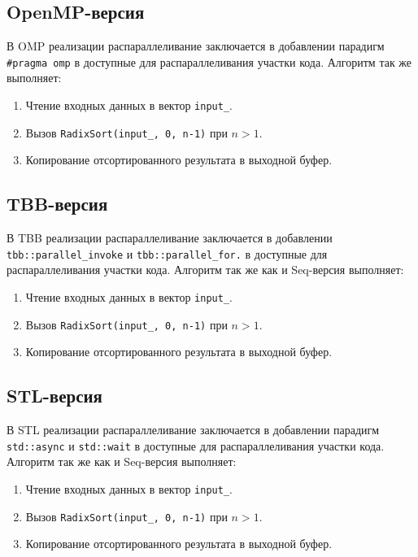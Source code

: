 \documentclass[a4paper,12pt]{article}
\begin{document}
\subsection{OpenMP-версия}
\hspace*{1.25em}В OMP реализации распараллеливание заключается в добавлении парадигм \texttt{\#pragma omp} в доступные для распараллеливания участки кода. Алгоритм так же выполняет:
\begin{enumerate}
    \item Чтение входных данных в вектор \texttt{input\_}.
    \item Вызов \texttt{RadixSort(input\_, 0, n-1)} при $n>1$.
    \item Копирование отсортированного результата в выходной буфер.
\end{enumerate}


\subsection{TBB-версия}
\hspace*{1.25em}В TBB реализации распараллеливание заключается в добавлении \texttt{tbb::parallel\_invoke} и \texttt{tbb::parallel\_for.} в доступные для распараллеливания участки кода. Алгоритм так же как и Seq-версия выполняет:
\begin{enumerate}
    \item Чтение входных данных в вектор \texttt{input\_}.
    \item Вызов \texttt{RadixSort(input\_, 0, n-1)} при $n>1$.
    \item Копирование отсортированного результата в выходной буфер.
\end{enumerate}
\subsection{STL-версия}
\hspace*{1.25em}В STL реализации распараллеливание заключается в добавлении парадигм \texttt{std::async} и \texttt{std::wait} в доступные для распараллеливания участки кода. Алгоритм так же как и Seq-версия выполняет:
\begin{enumerate}
    \item Чтение входных данных в вектор \texttt{input\_}.
    \item Вызов \texttt{RadixSort(input\_, 0, n-1)} при $n>1$.
    \item Копирование отсортированного результата в выходной буфер.
\end{enumerate}
\end{document}
